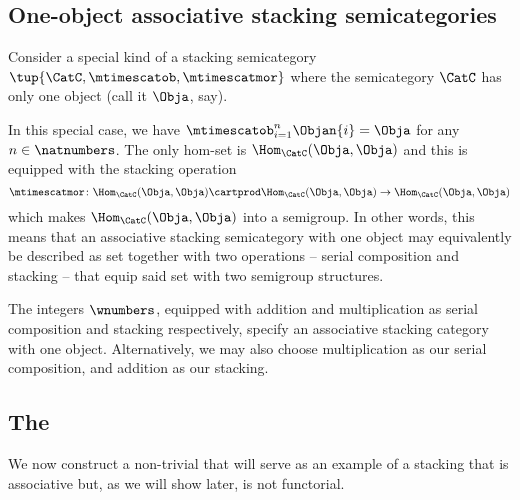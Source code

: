 %

\subsection{One-object associative stacking semicategories}

Consider a special kind of a stacking semicategory $\tup{\CatC, \mtimescatob, \mtimescatmor}$ where the semicategory $\CatC$ has only one object (call it $\Obja$, say). 

In this special case, we have $\mtimescatob_{i=1}^n \Objan{i} = \Obja$ for any $n \in \natnumbers$. The only hom-set is $\Hom_\CatC(\Obja, \Obja)$ and this is equipped with the stacking operation
\begin{equation}
\mtimescatmor \colon \Hom_\CatC(\Obja, \Obja) \cartprod \Hom_\CatC(\Obja, \Obja) \to \Hom_\CatC(\Obja, \Obja)
\end{equation}
which makes $\Hom_\CatC(\Obja, \Obja)$ into a semigroup. In other words, this means that an associative stacking semicategory with one object may equivalently be described as set together with two operations -- serial composition and stacking -- that equip said set with two semigroup structures. 

\begin{example}
The integers $\wnumbers$, equipped with addition and multiplication as serial composition and stacking respectively, specify an associative stacking category with one object. Alternatively, we may also choose multiplication as our serial composition, and addition as our stacking. 
\end{example}







\subsection{The  \Effects}

We now construct a non-trivial  that will serve as an example of a stacking  that is associative but, as we will show later, is not functorial.

